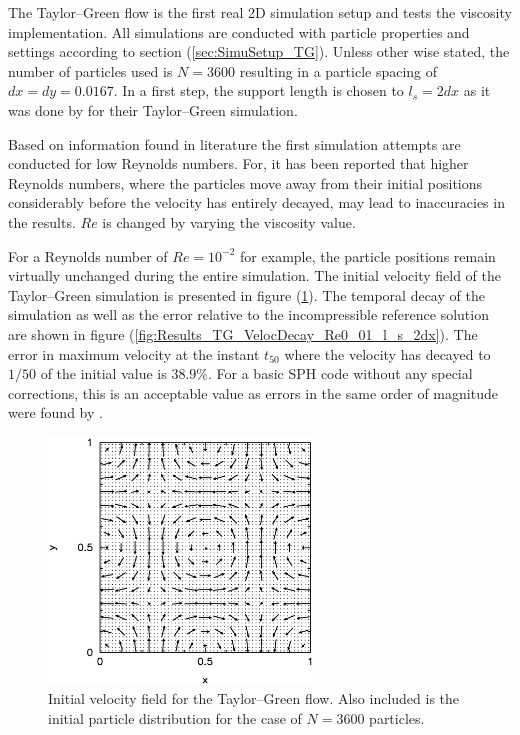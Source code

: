 \documentclass[11pt,a4paper,twoside]{report}
\begin{document}
The Taylor--Green flow is the first real 2D simulation setup and tests the viscosity implementation. All simulations are conducted with particle properties and settings according to section (\ref{sec:SimuSetup_TG}). Unless other wise stated, the number of particles used is $N=3600$ resulting in a particle spacing of $dx=dy=0.0167$. In a first step, the support length is chosen to $l_s=2dx$ as it was done by \cite{Hu2007} for their Taylor--Green simulation. %

Based on information found in literature \cite{Chaniotis2002, Ellero2007} the first simulation attempts are conducted for low Reynolds numbers. For, it has been reported that higher Reynolds numbers, where the particles move away from their initial positions considerably before the velocity has entirely decayed, may lead to inaccuracies in the results. $Re$ is changed by varying the viscosity value.

For a  Reynolds number of $Re=10^{-2}$ for example, the particle positions remain virtually unchanged during the entire simulation. The initial velocity field of the Taylor--Green simulation is presented in figure (\ref{fig:Results_TG_initvelocity}). The temporal decay of the simulation as well as the error relative to the incompressible reference solution are shown in figure (\ref{fig:Results_TG_VelocDecay_Re0_01_l_s_2dx}). The error in maximum velocity at the instant $t_{50}$  where the velocity has decayed to $1/50$ of the initial value is $38.9\%$. For a basic SPH code without any special corrections, this is an acceptable value as errors in the same order of magnitude were found by \cite{Hu2007}.

\begin{figure}[h]
 \label{fig:Results_TG_initvelocity}
\centering
\includegraphics[width=7cm]{Graphics/results/TaylorGreen/N3600_eta_100_suplen2dx/InitVeloc}
\caption[Velocity field Taylor--Green]{Initial velocity field for the Taylor--Green flow. Also included is the initial particle distribution for the case of $N=3600$ particles.}
\end{figure}
\end{document}
